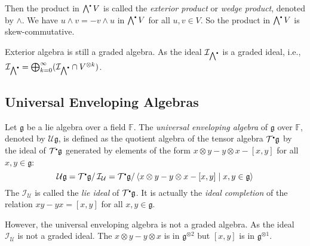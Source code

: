 \documentclass[
	11pt, %
	fleqn, %
	a4paper, %
]{LegrandOrangeBook}
\newcommand{\smallbullet}{\scalebox{0.5}{$\bullet$}}
\newcommand{\quotient}[2]{#1/\, #2} %
\newcommand{\F}{\mathbb{F}} %
\newcommand{\T}{\mathcal{T}^{\smallbullet}} %
\newcommand{\Ext}{\bigwedge^{\smallbullet}} %
\newcommand{\Env}{\mathcal{U}} %
\newcommand{\ideal}{\mathcal{I}} %
\begin{document}
Then the product in $\Ext V$ is called the \emph{exterior product} or \emph{wedge product}, denoted by $\wedge$. We have $u \wedge v = - v \wedge u$ in $\Ext V$ for all $u, v \in V$. So the product in $\Ext V$ is skew-commutative.

\begin{remark}
    Exterior algebra is still a graded algebra. As the ideal $\ideal_{\Ext}$ is a graded ideal, i.e., $\ideal_{\Ext} = \bigoplus_{k = 0}^{\infty} (\ideal_{\Ext} \cap V^{\otimes k})$.
\end{remark}

\subsection{Universal Enveloping Algebras}

Let $\mathfrak{g}$ be a lie algebra over a field $\F$. The \emph{universal enveloping algebra} of $\mathfrak{g}$ over $\F$, denoted by $\Env \mathfrak{g}$, is defined as the quotient algebra of the tensor algebra $\T \mathfrak{g}$ by the ideal of $\T \mathfrak{g}$ generated by elements of the form $x \otimes y - y \otimes x - [x, y]$ for all $x, y \in \mathfrak{g}$:
\[
    \Env \mathfrak{g} = \quotient{\T \mathfrak{g}}{\ideal_{\Env}} = \quotient{\T \mathfrak{g}}{\langle x \otimes y - y \otimes x - [x, y] \mid x, y \in \mathfrak{g} \rangle}
\]
The $\ideal_{\Env}$ is called the \emph{lie ideal} of $\T \mathfrak{g}$. It is actually the \emph{ideal completion} of the relation $xy - yx = [x, y]$ for all $x, y \in \mathfrak{g}$.

\begin{remark}
    However, the universal enveloping algebra is not a graded algebra. As the ideal $\ideal_{\Env}$ is not a graded ideal. The $x \otimes y - y \otimes x$ is in $\mathfrak{g}^{\otimes 2}$ but $[x, y]$ is in $\mathfrak{g}^{\otimes 1}$.
\end{remark}

\end{document}
